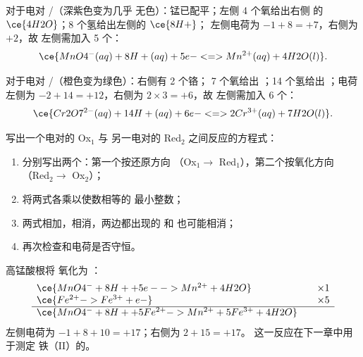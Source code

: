 \begin{example}[高锰酸根离子]\label{ex:g11:redox:permanganate}
对于电对 /（深紫色变为几乎
无色）：锰已配平；左侧 4 个氧给出右侧
的 $\ce{4H2O}$；8 个氢给出左侧的 $\ce{8H+}$；
左侧电荷为 $-1 + 8 = +7$，右侧为 $+2$，故
左侧需加入 5 个：
\[
  \ce{MnO4^-(aq) + 8H+(aq) + 5e- <=> Mn^{2+}(aq) + 4H2O(l)}.
\]
\end{example}

\begin{example}[重铬酸根离子]\label{ex:g11:redox:dichromate}
对于电对 /（橙色变为绿色）：右侧有 2 个铬；
7 个氧给出 ；14 个氢给出 ；电荷
左侧为 $-2 + 14 = +12$，右侧为 $2 \times 3 = +6$，故
左侧需加入 6 个：
\[
  \ce{Cr2O7^{2-}(aq) + 14H+(aq) + 6e- <=> 2Cr^{3+}(aq) + 7H2O(l)}.
\]
\end{example}

\begin{method}[写出氧化还原方程式]\label{met:g11:redox:combine}
写出一个电对的 Ox$_1$ 与
另一电对的 Red$_2$ 之间反应的方程式：
\begin{enumerate}
  \item 分别写出两个：第一个按还原方向
        （Ox$_1 \to$ Red$_1$），第二个按氧化方向
        （Red$_2 \to$ Ox$_2$）；
  \item 将两式各乘以使数相等的
        最小整数；
  \item 两式相加，相消，两边都出现的  和
         也可能相消；
  \item 再次检查和电荷是否守恒。
\end{enumerate}
\end{method}

\begin{example}[高锰酸根与铁（II）]\label{ex:g11:redox:mno4-fe}
高锰酸根将  氧化为 ：
\[
\begin{array}{l@{\qquad}l}
  \ce{MnO4^- + 8H+ + 5e- -> Mn^{2+} + 4H2O} & \times 1\\
  \ce{Fe^{2+} -> Fe^{3+} + e-} & \times 5\\
  \hline
  \ce{MnO4^- + 8H+ + 5Fe^{2+} -> Mn^{2+} + 5Fe^{3+} + 4H2O} &
\end{array}
\]
左侧电荷为 $-1 + 8 + 10 = +17$；右侧为 $2 + 15 = +17$。
这一反应在下一章中用于测定
铁（II）的。
\end{example}

